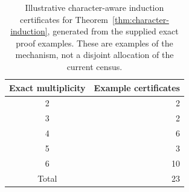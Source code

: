 \begin{table}[ht]\centering
\begin{tabular}{cr}\toprule
Exact multiplicity & Example certificates\\\midrule
2 & 2\\
3 & 2\\
4 & 6\\
5 & 3\\
6 & 10\\
\midrule Total & 23\\\bottomrule
\end{tabular}
\caption{Illustrative character-aware induction certificates for Theorem~\ref{thm:character-induction}, generated from the supplied exact proof examples. These are examples of the mechanism, not a disjoint allocation of the current census.}\label{tab:character-applications}
\end{table}
